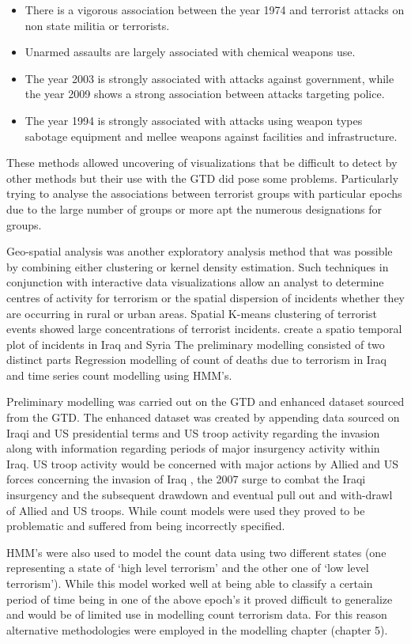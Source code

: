\begin{itemize}
\item There is a vigorous association between the year 1974 and terrorist attacks on non state militia or terrorists.
\item Unarmed assaults are largely associated with chemical weapons use.
\item The year 2003 is strongly associated with attacks against government, while the year 2009 shows a strong association between attacks targeting police.  
\item The year 1994 is strongly associated with attacks using weapon types sabotage equipment and mellee weapons against facilities and infrastructure.
\end{itemize}

These methods allowed uncovering of visualizations that be difficult to detect by other methods but their use with the GTD did pose some problems. Particularly trying to analyse the associations between terrorist groups with particular epochs due to the large number of groups or more apt the numerous designations for groups. 

Geo-spatial analysis was another exploratory analysis method that was possible by combining either clustering or kernel density estimation.  Such techniques in conjunction with interactive data visualizations allow an analyst to determine centres of activity for terrorism or the spatial dispersion of incidents whether they are occurring in rural or urban areas. Spatial K-means clustering of terrorist events showed large concentrations of terrorist incidents. 
create a spatio temporal plot of incidents in Iraq and Syria
The preliminary modelling consisted of two distinct parts Regression modelling of count of deaths due to terrorism in Iraq and time series count modelling using HMM’s.

Preliminary modelling was carried out on the GTD and enhanced dataset sourced from the GTD. The enhanced dataset was created by appending data sourced on Iraqi and US presidential terms and US troop activity regarding the invasion along with information regarding periods of major insurgency activity within Iraq. US troop activity would be concerned with major actions by Allied and US forces concerning the invasion of Iraq , the 2007 surge to combat the Iraqi insurgency and the subsequent drawdown and eventual pull out and with-drawl of Allied and US troops. While count models were used they proved to be problematic and suffered from being incorrectly specified.   

HMM’s were also used to model the count data using two different states (one representing a state of ‘high level terrorism’ and the other one of ‘low level terrorism’). While this model worked well at being able to classify a certain period of time being in one of the above epoch’s it proved difficult to generalize and would be of limited use in modelling count terrorism data. For this reason alternative methodologies were employed in the modelling chapter (chapter 5).

